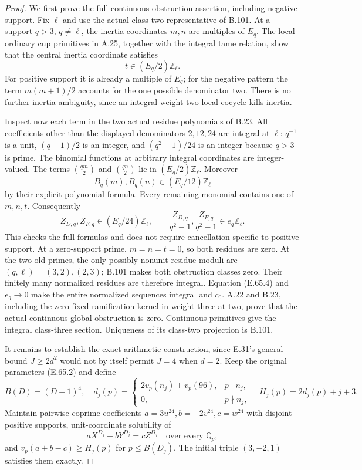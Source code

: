 \begin{proof}
We first prove the full continuous
obstruction assertion, including
negative support.
Fix $\ell$ and use the actual
class-two representative of B.101.
At a support $q>3$, $q\ne\ell$,
the inertia coordinates $m,n$
are multiples of $E_q$.
The local ordinary cup primitives
in A.25, together with the integral
tame relation, show that the central
inertia coordinate satisfies
\[
                         t\in(E_q/2)\mathbb Z_\ell .
\]
For positive support it is already
a multiple of $E_q$; for the
negative pattern the term
$m(m+1)/2$ accounts for the one
possible denominator two.
There is no further inertia
ambiguity, since an integral
weight-two local cocycle kills
inertia.

Inspect now each term in the two
actual residue polynomials of B.23.
All coefficients other than
the displayed denominators $2,12,24$
are integral at $\ell$:
$q^{-1}$ is a unit,
$(q-1)/2$ is an integer, and
$(q^2-1)/24$ is an integer because
$q>3$ is prime. The binomial
functions at arbitrary integral
coordinates are integer-valued.
The terms $\binom{qm}{2}$ and
$\binom{qn}{2}$ lie in
$(E_q/2)\mathbb Z_\ell$.
Moreover
\[
 B_q(m),B_q(n)\in(E_q/12)\mathbb Z_\ell
\]
by their explicit polynomial formula.
Every remaining monomial contains
one of $m,n,t$.
Consequently
\[
 Z_{D,q},Z_{F,q}\in(E_q/24)\mathbb Z_\ell,
 \qquad
 \frac{Z_{D,q}}{q^2-1},
 \frac{Z_{F,q}}{q^2-1}\in e_q\mathbb Z_\ell .
 \tag{E.65.4}
\]
This checks the full formulas and
does not require cancellation
specific to positive support.
At a zero-support prime, $m=n=t=0$,
so both residues are zero.
At the two old primes, the only
possibly nonunit residue moduli
are $(q,\ell)=(3,2),(2,3)$;
B.101 makes both obstruction
classes zero. Their finitely
many normalized residues are
therefore integral.
Equation (E.65.4) and $e_q\to0$
make the entire normalized
sequences integral and $c_0$.
A.22 and B.23, including the
zero fixed-ramification kernel
in weight three at two, prove
that the actual continuous
global obstruction is zero.
Continuous primitives give
the integral class-three section.
Uniqueness of its class-two
projection is B.101.

It remains to establish the exact
arithmetic construction, since
E.31's general bound $J\geq2d^2$
would not by itself permit $J=4$
when $d=2$. Keep the original
parameters (E.65.2) and define
\[
 B(D)=(D+1)^4,\quad
 d_j(p)=
 \begin{cases}
  2v_p(n_j)+v_p(96),&p\mid n_j,\\
  0,&p\nmid n_j,
 \end{cases}
 \quad H_j(p)=2d_j(p)+j+3 .
 \tag{E.65.5}
\]
Maintain pairwise coprime coefficients
$a=3u^{24},b=-2v^{24},c=w^{24}$
with disjoint positive supports,
unit-coordinate solubility of
\[
 aX^{D_j}+bY^{D_j}=cZ^{D_j}
                         \quad\text{over every }\mathbb Q_p,
 \tag{E.65.6}
\]
and
$v_p(a+b-c)\geq H_j(p)$ for
$p\leq B(D_j)$.
The initial triple $(3,-2,1)$
satisfies them exactly.


\end{proof}
